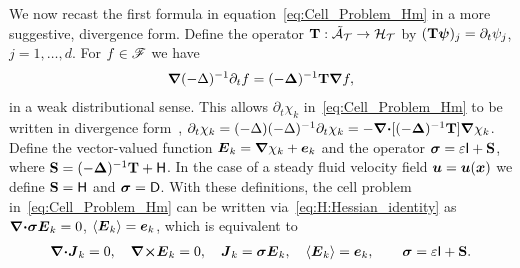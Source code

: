 \documentclass[amsa]{ipart}
\begin{document}
We now recast the first formula in equation~\eqref{eq:Cell_Problem_Hm}
in a more suggestive, divergence form. Define the operator
$\mathbf{T}:\tilde{\mathcal{A}}_{\mathcal{T}}\to\mathcal{H}_{\mathcal{T}}$ by $(\mathbf{T}\boldsymbol{\psi})_j=\partial_t\psi_j$,
$j=1,\ldots,d$. For $f\in\mathscr{F}$ we
have~\cite{Fannjiang:1994:SIAM_JAM:333,Novikov:2005:CPAM:867,Folland:99:RealAnalysis}     
%
\begin{align}\label{eq:Dt_T}
  \bnabla(-\Delta)^{-1}\partial_t f=(-\bDelta)^{-1}\Tb\bnabla f ,
\end{align}
%
in a weak distributional sense. This allows $\partial_t\chi_k$
in~\eqref{eq:Cell_Problem_Hm} to be written in divergence 
form~\cite{Fannjiang:1994:SIAM_JAM:333,Novikov:2005:CPAM:867},      
$\partial_t\chi_k=(-\Delta)(-\Delta)^{-1}\partial_t\chi_k=-\mbox{\boldmath${\nabla}$}\mbox{\boldmath${\cdot}$}[(-\mbox{\boldmath${\Delta}$})^{-1}\mathbf{T}]\mbox{\boldmath${\nabla}$}
\chi_k$. Define the vector-valued function $\boldsymbol{E}_k=\mbox{\boldmath${\nabla}$} \chi_k+\boldsymbol{e}_k$
and the operator $\mbox{\boldmath${\sigma}$}=\varepsilon\mathsf{I}+\mathbf{S}$, where
$\mathbf{S}=(-\mbox{\boldmath${\Delta}$})^{-1}\mathbf{T}+\mathsf{H}$. In the case of a steady fluid velocity
field $\boldsymbol{u}=\boldsymbol{u}(\boldsymbol{x})$ we define 
$\mathbf{S}=\mathsf{H}$ and $\mbox{\boldmath${\sigma}$}=\mathsf{D}$. With these definitions, the cell problem
in~\eqref{eq:Cell_Problem_Hm} can be written
via~\eqref{eq:H:Hessian_identity} as
$\mbox{\boldmath${\nabla}$}\mbox{\boldmath${\cdot}$}\mbox{\boldmath${\sigma}$}\boldsymbol{E}_k=0$, $\langle\boldsymbol{E}_k\rangle=\boldsymbol{e}_k$, which is
equivalent to 
%
\begin{align}\label{eq:Maxwells_Equations}    
  \bnabla \bcdot\vecJ_k=0, \quad
  \bnabla \btimes\vecE_k=0, \quad
  \vecJ_k=\bsig\vecE_k,\quad
  \langle\vecE_k\rangle=\vece _k,\qquad
  \bsig%
       =\varepsilon\Ib+\Sb.
\end{align}
%
\end{document}
